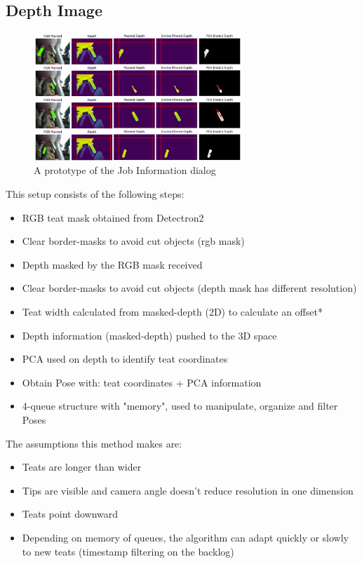     \subsection{Depth Image}
    \begin{figure}[!ht]
        \centering
        \includegraphics[width=0.7\textwidth]{images/cow_segment.png}
        \caption{A prototype of the Job Information dialog}
        \label{fig:cow_fmc}
    \end{figure}
    \lipsum[2-3]
    This setup consists of the following steps:
        \begin{itemize}
        \item RGB teat mask obtained from Detectron2
        \item Clear border-masks to avoid cut objects (rgb mask)
        \item Depth masked by the RGB mask received
        \item Clear border-masks to avoid cut objects (depth mask has different resolution)
        \item Teat width calculated from masked-depth (2D) to calculate an offset*
        \item Depth information (masked-depth) pushed to the 3D space
        \item PCA used on depth to identify teat coordinates
        \item Obtain Pose with: teat coordinates + PCA information 
        \item 4-queue structure with "memory", used to manipulate, organize and filter Poses
        \end{itemize}
    
    The assumptions this method makes are:
        \begin{itemize}
            \item Teats are longer than wider
            \item Tips are visible and camera angle doesn't reduce resolution in one dimension
            \item Teats point downward
            \item Depending on memory of queues, the algorithm can adapt quickly or slowly to new teats (timestamp filtering on the backlog)
        \end{itemize}
    \lipsum[2]
    
